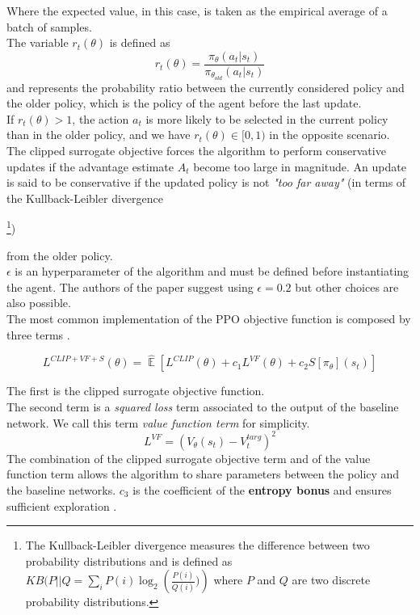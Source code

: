 \documentclass{article}
\DeclareMathOperator{\EX}{\mathbb{E}}%
\begin{document}
Where the expected value, in this case, is taken as the empirical average of a batch of samples.\\
The variable \(r_{t}(\theta)\) is defined as
\begin{equation}\label{eq:ratioR}
r_{t}(\theta) = \frac{\pi_{\theta}(a_{t}|s_{t})}{\pi_{\theta_{old}}(a_{t}|s_{t})}
\end{equation}
and represents the probability ratio between the currently considered policy and the older policy, which is the policy of the agent before the last update. \\
If \(r_{t}(\theta) > 1\), the action \(a_{t}\) is more likely to be selected in the current policy than in the older policy, and  we have \(r_{t}(\theta) \in  [0,1)\) in the opposite scenario.\\
The clipped surrogate objective forces the algorithm to perform conservative updates if the advantage estimate \(A_{t}\) become too large in magnitude. An update is said to be conservative if the updated policy is not \textit{"too far away"} (in terms of the Kullback-Leibler divergence 

\footnote{The Kullback-Leibler divergence measures the difference between two probability distributions and is defined as \(KB(P||Q = \sum_{i}P(i) \log_{2}\left(\frac{P(i)}{Q(i)})\right)\) where \(P\) and \(Q\) are two discrete probability distributions. }) 

 from the older policy.\\
\(\epsilon\) is an hyperparameter of the algorithm and must be defined before instantiating the agent. The authors of the paper suggest using \(\epsilon= 0.2\) but other choices are also possible.\\

The most common implementation of the PPO   objective function is composed by three terms \cite{schulman2017proximal_PPO}.

\begin{equation}\label{eq:completeObjective}
L^{CLIP+VF+S}(\theta) = \hat{\EX}[L^{CLIP}(\theta) + c_{1}L^{VF}(\theta)+c_{2}S[\pi_{\theta}](s_{t})]
\end{equation}

\noindent
The first is the clipped surrogate objective function. \\
The second term is a \textit{squared loss} term associated to the output of the baseline network. We call this term \textit{value function term} for simplicity.
\begin{equation}
L^{VF}= (V_{\theta}(s_{t})- V_{t}^{targ})^{2}
\end{equation}
The combination of the clipped surrogate objective term and of the value function term allows the algorithm to share parameters between the policy and the baseline networks. \(c_{3}\) is the coefficient of the \textbf{entropy bonus} and ensures sufficient exploration \cite{schulman2017proximal_PPO}. 
\end{document}
